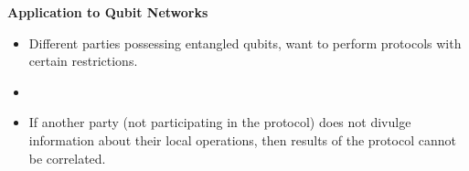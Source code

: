 \documentclass[usenames,dvipsnames]{beamer}
\begin{document}
	\begin{frame}{\textbf{Application to Qubit Networks}}
		\begin{itemize}
			\item {} {Different parties possessing entangled qubits, want to perform protocols with certain restrictions. }
			\item {}
			\item {} {If another party (not participating in the protocol) does not divulge information about their local operations, then results of the protocol cannot be correlated.}
		\end{itemize}
		\begin{figure}
			\centering
\end{figure}
\end{frame}
\end{document}
